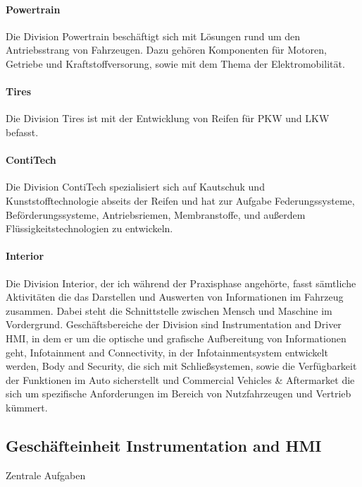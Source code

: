 \paragraph{Powertrain}
Die Division Powertrain beschäftigt sich mit Lösungen rund um den Antriebsstrang von Fahrzeugen. Dazu gehören Komponenten für Motoren, Getriebe und Kraftstoffversorung, sowie mit dem Thema der Elektromobilität. 

\paragraph{Tires}
Die Division Tires ist mit der Entwicklung von Reifen für PKW und LKW befasst. 
\paragraph{ContiTech}
Die Division ContiTech spezialisiert sich auf Kautschuk und Kunststofftechnologie abseits der Reifen und hat zur Aufgabe Federungssysteme, Beförderungssysteme, Antriebsriemen, Membranstoffe, und außerdem Flüssigkeitstechnologien zu entwickeln. 

\paragraph{Interior}
Die Division Interior, der ich während der Praxisphase angehörte, fasst sämtliche Aktivitäten die das Darstellen und Auswerten von Informationen im Fahrzeug zusammen. Dabei steht die Schnittstelle zwischen Mensch und Maschine im Vordergrund.
Geschäftsbereiche der Division sind Instrumentation and Driver HMI, in dem er um die optische und grafische Aufbereitung von Informationen geht, Infotainment and Connectivity, in der Infotainmentsystem entwickelt werden, Body and Security, die sich  mit Schließsystemen, sowie die Verfügbarkeit der Funktionen im Auto sicherstellt  und Commercial Vehicles \& Aftermarket die sich um spezifische Anforderungen im Bereich von Nutzfahrzeugen und Vertrieb kümmert.


\subsection{Geschäfteinheit Instrumentation and HMI}
Zentrale Aufgaben 

